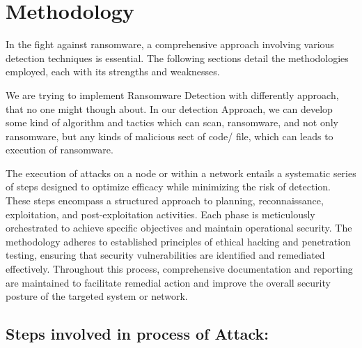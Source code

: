 \documentclass[12pt,twocolumn]{article}
\begin{document}
%
\vspace*{0.5 cm}

\section{Methodology}

In the fight against ransomware, a comprehensive approach involving various detection techniques is essential. The following sections detail the methodologies employed, each with its strengths and weaknesses.

We are trying to implement Ransomware Detection with differently approach, that no one might though about. In our detection Approach, we can develop some kind of algorithm and tactics which can scan, ransomware, and not only ransomware, but any kinds of malicious sect of code/ file, which can leads to execution of ransomware. 

The execution of attacks on a node or within a network entails a systematic series of steps designed to optimize efficacy while minimizing the risk of detection. These steps encompass a structured approach to planning, reconnaissance, exploitation, and post-exploitation activities. Each phase is meticulously orchestrated to achieve specific objectives and maintain operational security. The methodology adheres to established principles of ethical hacking and penetration testing, ensuring that security vulnerabilities are identified and remediated effectively. Throughout this process, comprehensive documentation and reporting are maintained to facilitate remedial action and improve the overall security posture of the targeted system or network.

\subsection{Steps involved in process of Attack:}
\end{document}
